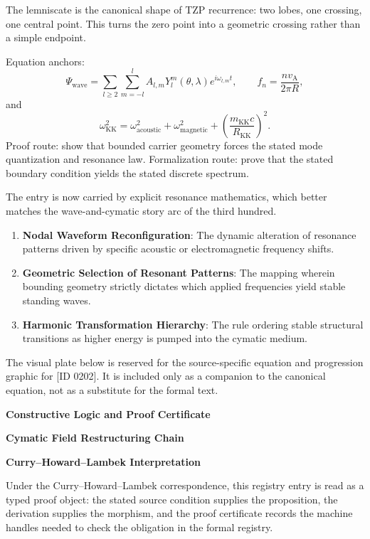 The lemniscate is the canonical shape of TZP recurrence: two lobes, one crossing, one central point. This turns the zero point into a geometric crossing rather than a simple endpoint.

Equation anchors:
\[
\Psi_{\mathrm{wave}}=\sum_{l\ge2}\sum_{m=-l}^{l}A_{l,m}Y_l^m(\theta,\lambda)e^{i\omega_{l,m}t},
\qquad
f_n=\frac{n v_{\mathrm{A}}}{2\pi R},
\]
and
\[
\omega_{\mathrm{KK}}^2=\omega_{\mathrm{acoustic}}^2+\omega_{\mathrm{magnetic}}^2
+\left(\frac{m_{\mathrm{KK}}c}{R_{\mathrm{KK}}}\right)^2.
\]
Proof route: show that bounded carrier geometry forces the stated mode quantization and resonance law. Formalization route: prove that the stated boundary condition yields the stated discrete spectrum.

The entry is now carried by explicit resonance mathematics, which better matches the wave-and-cymatic story arc of the third hundred.
\endgroup

\begin{enumerate}[leftmargin=1.6em,itemsep=6pt,topsep=4pt]
\item \textbf{Nodal Waveform Reconfiguration}: The dynamic alteration of resonance patterns driven by specific acoustic or electromagnetic frequency shifts.
\item \textbf{Geometric Selection of Resonant Patterns}: The mapping wherein bounding geometry strictly dictates which applied frequencies yield stable standing waves.
\item \textbf{Harmonic Transformation Hierarchy}: The rule ordering stable structural transitions as higher energy is pumped into the cymatic medium.
\end{enumerate}

\begingroup\footnotesize\sloppy
The visual plate below is reserved for the source-specific equation and progression graphic for [ID 0202]. It is included only as a companion to the canonical equation, not as a substitute for the formal text.
\par\endgroup
\ifTZPDarkEdition
{}
\fi

\clearpage
\begingroup\tzpsupportsetup
\noindent\textbf{\fontsize{10.8pt}{12.8pt}\selectfont [ID 0202] Constructive Logic and Proof Certificate}\par
\noindent\textbf{\fontsize{10pt}{12pt}\selectfont Cymatic Field Restructuring Chain}\par
\vspace{0.45em}
\begingroup
\footnotesize
\setlength{\parskip}{0.22em}
\setlength{\parindent}{0pt}
\noindent\textbf{Curry--Howard--Lambek Interpretation}\par
Under the Curry--Howard--Lambek correspondence, this registry entry is read as a typed proof
object: the stated source condition supplies the proposition, the derivation supplies the
morphism, and the proof certificate records the machine handles needed to check the obligation
in the formal registry.

